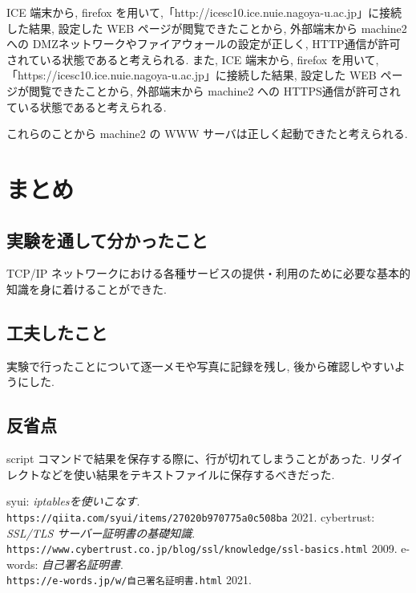 \documentclass{ltjsarticle} %
\begin{document}
ICE 端末から, firefox を用いて,「http://icesc10.ice.nuie.nagoya-u.ac.jp」に接続した結果, 設定した WEB ページが閲覧できたことから, 
外部端末から machine2 への DMZネットワークやファイアウォールの設定が正しく, HTTP通信が許可されている状態であると考えられる. 
また, ICE 端末から, firefox を用いて,「https://icesc10.ice.nuie.nagoya-u.ac.jp」に接続した結果, 設定した WEB ページが閲覧できたことから, 
外部端末から machine2 への HTTPS通信が許可されている状態であると考えられる. 

これらのことから machine2 の WWW サーバは正しく起動できたと考えられる. 


\section{まとめ}

\subsection{実験を通して分かったこと}
TCP/IP ネットワークにおける各種サービスの提供・利用のために必要な基本的知識を身に着けることができた. 

\subsection{工夫したこと}
実験で行ったことについて逐一メモや写真に記録を残し, 後から確認しやすいようにした. 

\subsection{反省点}
script コマンドで結果を保存する際に、行が切れてしまうことがあった. 
リダイレクトなどを使い結果をテキストファイルに保存するべきだった. 


\begin{thebibliography}{99} %
    
  syui: 
  \emph{iptablesを使いこなす}. \\
  \verb|https://qiita.com/syui/items/27020b970775a0c508ba|  2021. 
  cybertrust: 
  \emph{SSL/TLS サーバー証明書の基礎知識}. \\
  \verb|https://www.cybertrust.co.jp/blog/ssl/knowledge/ssl-basics.html|  2009.
  e-words: 
  \emph{自己署名証明書}. \\
  \verb|https://e-words.jp/w/自己署名証明書.html|  2021.

\end{thebibliography}
\end{document}
